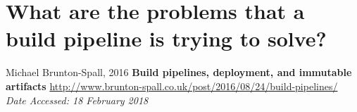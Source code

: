 \documentclass{article}
\newcommand{\question}[1]{\section{#1}}
\begin{document}
\question{What are the problems that a build pipeline is trying to solve?}


{\footnotesize
\begin{thebibliography}{5}
    Michael Brunton-Spall, 2016
    \textbf{Build pipelines, deployment, and immutable artifacts}
    \url{http://www.brunton-spall.co.uk/post/2016/08/24/build-pipelines/}
    \textit{Date Accessed: 18 February 2018}
\end{thebibliography}
}

\clearpage
\question{}

\end{document}
